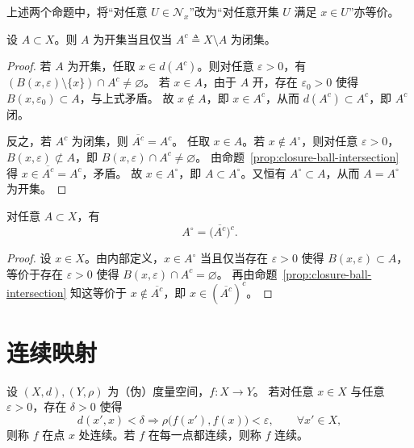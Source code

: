 \documentclass[lang=cn,a4paper,newtx,section]{elegantbook}
\begin{document}
\begin{remark}
  上述两个命题中，将“对任意 $U\in\mathcal{N}_x$”改为“对任意开集 $U$ 满足 $x\in U$”亦等价。
\end{remark}

\begin{proposition}
  设 $A\subset X$。则 $A$ 为开集当且仅当 $A^c\triangleq X\setminus A$ 为闭集。
\end{proposition}

\begin{proof}
  若 $A$ 为开集，任取 $x\in d(A^c)$。则对任意 $\varepsilon>0$，有 $(B(x,\varepsilon)\setminus\{x\})\cap A^c\ne\varnothing$。
  若 $x\in A$，由于 $A$ 开，存在 $\varepsilon_0>0$ 使得 $B(x,\varepsilon_0)\subset A$，与上式矛盾。
  故 $x\notin A$，即 $x\in A^c$，从而 $d(A^c)\subset A^c$，即 $A^c$ 闭。

  反之，若 $A^c$ 为闭集，则 $\overline{A^c}=A^c$。
  任取 $x\in A$。若 $x\notin A^\circ$，则对任意 $\varepsilon>0$，$B(x,\varepsilon)\not\subset A$，即 $B(x,\varepsilon)\cap A^c\ne\varnothing$。
  由命题~\ref{prop:closure-ball-intersection} 得 $x\in\overline{A^c}=A^c$，矛盾。
  故 $x\in A^\circ$，即 $A\subset A^\circ$。又恒有 $A^\circ\subset A$，从而 $A=A^\circ$ 为开集。
\end{proof}

\begin{proposition}
  对任意 $A\subset X$，有
  \[
    A^\circ=\bigl(\overline{A^c}\bigr)^c.
  \]
\end{proposition}

\begin{proof}
  设 $x\in X$。由内部定义，$x\in A^\circ$ 当且仅当存在 $\varepsilon>0$ 使得 $B(x,\varepsilon)\subset A$，等价于存在 $\varepsilon>0$ 使得 $B(x,\varepsilon)\cap A^c=\varnothing$。
  再由命题~\ref{prop:closure-ball-intersection} 知这等价于 $x\notin\overline{A^c}$，即 $x\in (\overline{A^c})^c$。
\end{proof}

\section{连续映射}

\begin{definition}
  设 $(X,d),(Y,\rho)$ 为（伪）度量空间，$f:X\to Y$。
  若对任意 $x\in X$ 与任意 $\varepsilon>0$，存在 $\delta>0$ 使得
  \[
    d(x',x)<\delta \Rightarrow \rho\bigl(f(x'),f(x)\bigr)<\varepsilon,\qquad \forall x'\in X,
  \]
  则称 $f$ 在点 $x$ 处连续。若 $f$ 在每一点都连续，则称 $f$ 连续。
\end{definition}
\end{document}
